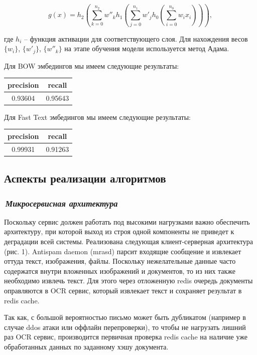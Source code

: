 \documentclass[12pt]{article}
\begin{document}
$$
g(x) = h_2 \left(\sum_{k=0}^{n_2} w''_k h_1\left(\sum_{j=0}^{n_1} w'_j h_0\left( \sum_{i=0}^{n_0} w_i x_i \right)\right)\right),
$$

где $h_i$ -- функция активации для соответствующего слоя. Для нахождения весов $\{w_i\}$, $\{w'_j\}$, $\{w''_k\}$ на этапе обучения модели используется метод Адама.

Для BOW эмбедингов мы имеем следующие результаты:
\begin{center}
  \begin{tabular}{ | c | c |}
    \hline
     precision & recall \\ \hline
     0.93604 & 0.95643 \\ \hline
  \end{tabular}
\end{center}

Для Fast Text эмбедингов мы имеем следующие результаты:
\begin{center}
  \begin{tabular}{ | c | c |}
    \hline
     precision & recall \\ \hline
     0.99931 & 0.91263 \\ \hline
  \end{tabular}
\end{center}

\subsection{Аспекты реализации алгоритмов}

\subsubsection*{\it\,Микросервисная архитектура}

Поскольку сервис должен работать под высокими нагрузками важно обеспечить архитектуру, при которой выход из строя одной компоненты не приведет к деградации всей системы. Реализована следующая клиент-серверная архитектура (рис. 1). Antispam daemon (mrasd) парсит входящие сообщение и извлекает оттуда текст, изображения, файлы.  Поскольку нежелательные данные часто содержатся внутри вложенных изображений и документов, то из них также необходимо извлечь текст. Для этого через отложенную redis очередь документы оправляются в OCR сервис, который извлекает текст и сохраняет результат в redis cache.

Так как, с большой вероятностью письмо может быть дубликатом (например в случае ddos атаки или оффлайн перепроверки), то чтобы не нагрузать лишний раз OCR сервис, производится первичная проверка redis cache на наличие уже обработанных данных по заданному хэшу документа.
\end{document}
